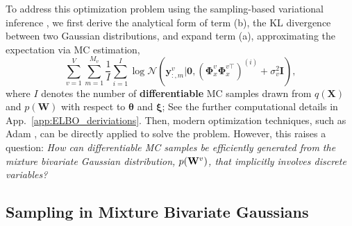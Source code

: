 To address this optimization problem using the sampling-based variational inference \citep{kingma2013auto}, we first derive the analytical form of term (b), the \MakeUppercase{kl} divergence between two Gaussian distributions, and expand term (a), approximating the expectation via \MakeUppercase{mc} estimation,
\begin{equation}
    \sum_{v=1}^{V} \sum_{m=1}^{M_v} \frac{1}{I} \sum_{i=1}^I \log \mathcal{N}\left(\mathbf{y}_{:, m}^{v} \vert \mathbf{0}, (\bm \Phi_{x}^{v} \bm \Phi_{x}^{v \top})^{(i)} \!+\! \sigma^2_{v} \mathbf{I}\right),  
    \label{eq:gaussian_elbo_estimate}
\end{equation}
where $I$ denotes the number of \textbf{differentiable} \MakeUppercase{mc} samples drawn from $q(\mathbf{X})$ and $p(\mathbf{W})$ with respect to $\bm \theta$ and $\bm \xi$; See the further computational details in App.~\ref{app:ELBO_deriviations}. Then, modern optimization techniques, such as Adam \citep{kingma2015adam}, can be directly applied to solve the problem. However, this raises a question: \textit{How can differentiable \MakeUppercase{mc} samples be efficiently generated from the mixture bivariate Gaussian distribution, \(p({\mathbf W}^{v})\), that implicitly involves discrete variables?} 


\vspace{-0.02in}
\subsection{Sampling in Mixture Bivariate Gaussians}
\label{subsec:differentialble_rff}
\vspace{-0.02in}

